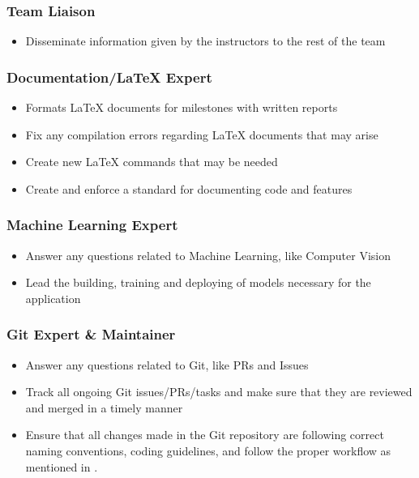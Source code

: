 \documentclass[12pt,letterpaper]{article}
\begin{document}
\subsubsection{Team Liaison}
\begin{itemize}
    \item Disseminate information given by the instructors to the rest of the
    team
\end{itemize}

\subsubsection{Documentation/LaTeX Expert}
\begin{itemize}
    \item Formats LaTeX documents for milestones with written reports
    \item Fix any compilation errors regarding LaTeX documents that may arise
    \item Create new LaTeX commands that may be needed
    \item Create and enforce a standard for documenting code and features
\end{itemize}

\subsubsection{Machine Learning Expert}
\label{mlexpert}
\begin{itemize}
    \item Answer any questions related to Machine Learning, like Computer Vision
    \item Lead the building, training and deploying of models necessary for the
    application
\end{itemize}

\subsubsection{Git Expert \& Maintainer}
\begin{itemize}
    \item Answer any questions related to Git, like PRs and Issues
    \item Track all ongoing Git issues/PRs/tasks and make sure that they are
    reviewed and merged in a timely manner
    \item Ensure that all changes made in the Git repository are following
    correct naming conventions, coding guidelines, and follow the proper
    workflow as mentioned in .
\end{itemize}
\end{document}

